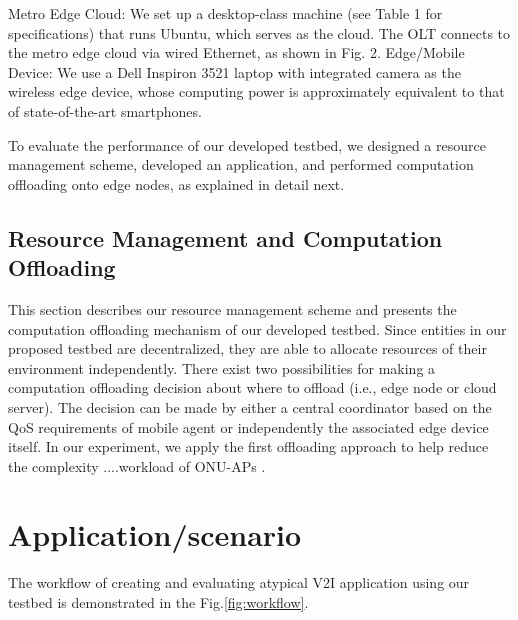 \documentclass[conference]{IEEEtran}
\begin{document}
Metro Edge Cloud: We set up a desktop-class machine (see Table 1 for specifications) that 
runs Ubuntu, which serves as the cloud. The OLT connects to the metro edge cloud 
via wired Ethernet, as shown in Fig. 2.
Edge/Mobile Device: We use a Dell Inspiron 3521 laptop with integrated camera as the 
wireless edge device, whose computing power is 
approximately equivalent to that of state-of-the-art 
smartphones.

\par To evaluate the performance of our developed testbed, we designed a resource management scheme, developed an application, and performed computation offloading onto edge nodes, as explained in detail next.
\subsection{Resource Management and Computation Offloading}
\par This section describes our resource management scheme and presents the computation offloading mechanism of our developed testbed.
Since entities in our proposed testbed are decentralized, they are able to allocate resources of their environment independently. There exist two  possibilities for making a computation offloading decision about where to offload (i.e., edge node or cloud server). The decision can be made by either a central coordinator based on the QoS 
requirements of mobile agent or independently the associated edge device itself. In our experiment, we apply the 
first offloading approach to help reduce the complexity ....workload of ONU-APs .

\section{Application/scenario}
\par The workflow of creating and evaluating atypical V2I application using our testbed is demonstrated in the Fig.\ref{fig:workflow}.
\end{document}
